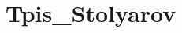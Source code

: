 \chapter{Tpis\+\_\+\+Stolyarov}
\hypertarget{md__r_e_a_d_m_e}{}\label{md__r_e_a_d_m_e}
\label{md__r_e_a_d_m_e_autotoc_md0}%
%
